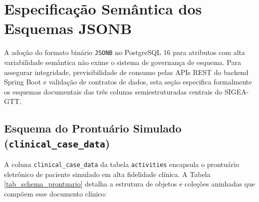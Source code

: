 \chapter{Especificação Semântica dos Esquemas JSONB}
\label{cap_esquemas_json}

A adoção do formato binário \texttt{JSONB} no PostgreSQL 16 para atributos com alta variabilidade semântica não exime o sistema de governança de esquema. Para assegurar integridade, previsibilidade de consumo pelas APIs REST do backend Spring Boot e validação de contratos de dados, esta seção especifica formalmente os esquemas documentais das três colunas semiestruturadas centrais do SIGEA-GTT.

\section{Esquema do Prontuário Simulado (\texttt{clinical\_case\_data})}
\label{sec_schema_prontuario}

A coluna \texttt{clinical\_case\_data} da tabela \texttt{activities} encapsula o prontuário eletrônico de paciente simulado em alta fidelidade clínica. A Tabela \ref{tab_schema_prontuario} detalha a estrutura de objetos e coleções aninhadas que compõem esse documento clínico:

